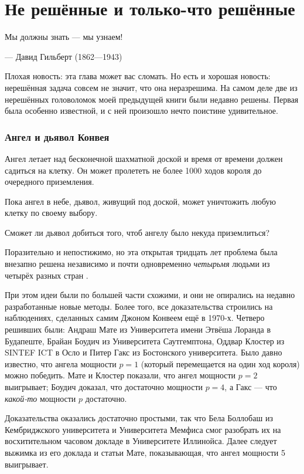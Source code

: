 \chapter{Не решённые и только-что решённые}


\setlength{\epigraphwidth}{.80\textwidth}
\epigraph{Мы должны знать --- мы узнаем!
}{--- Давид Гильберт (1862---1943)}

Плохая новость: эта глава может вас сломать.
Но есть и хорошая новость: нерешённая задача совсем не значит, что она неразрешима.
На самом деле две из нерешённых головоломок моей предыдущей книги были недавно решены.
Первая была особенно известной, и с ней произошло нечто поистине удивительное.

\subsection*{Ангел и дьявол Конвея}

Ангел летает над бесконечной шахматной доской и время от времени
должен садиться на клетку.
Он может пролететь не более 1000 ходов короля до очередного приземления.

Пока ангел в небе, дьявол, живущий под доской, может уничтожить любую клетку по своему выбору.

Сможет ли дьявол добиться того, чтоб ангелу было некуда приземлиться?

\medskip

Поразительно и непостижимо, но эта открытая тридцать лет проблема была внезапно решена независимо и почти одновременно
\emph{четырьмя} людьми из четырёх разных стран \cite{10, 20, 40, 43}.

При этом идеи были по большей части схожими, и они не опирались на недавно разработанные новые методы.
Более того, все доказательства строились на наблюдениях, сделанных самим Джоном Конвеем ещё в 1970-х.
Четверо решивших были:
Андраш Мате из Университета имени Этвёша Лоранда в Будапеште,
Брайан Боудич из Университета Саутгемптона,
Оддвар Клостер из SINTEF ICT в Осло
и Питер Гакс из Бостонского университета.
Было давно известно, что ангела мощности $p=1$ (который перемещается на один ход короля) можно победить.
Мате и Клостер показали, что ангел мощности $p=2$ выигрывает;
Боудич доказал, что достаточно мощности $p=4$,
а Гакс --- что \emph{какой-то} мощности $p$ достаточно.

Доказательства оказались достаточно простыми, так что Бела Боллобаш из Кембриджского университета и Университета Мемфиса смог разобрать их на восхитительном часовом докладе в Университете Иллинойса.
Далее следует выжимка из его доклада и статьи Мате, показывающая, что ангел мощности 5 выигрывает.

